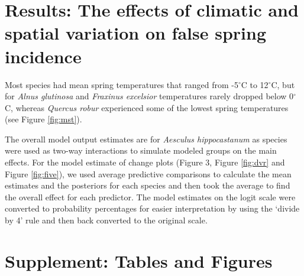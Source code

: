 \documentclass{article}\usepackage[]{graphicx}\usepackage[]{color}
\begin{document}
\section*{Results: The effects of climatic and spatial variation on false spring incidence}
Most species had mean spring temperatures that ranged from -5$^{\circ}$C to 12$^{\circ}$C, but for \textit{Alnus glutinosa} and \textit{Fraxinus excelsior} temperatures rarely dropped below 0$^{\circ}$C, whereas \textit{Quercus robur} experienced some of the lowest spring temperatures (see Figure \ref{fig:mst}). 

The overall model output estimates are for \textit{Aesculus hippocastanum} as species were used as two-way interactions to simulate modeled groups on the main effects. For the model estimate of change plots (Figure 3, Figure \ref{fig:dvr} and Figure \ref{fig:five}), we used average predictive comparisons to calculate the mean estimates and the posteriors for each species and then took the average to find the overall effect for each predictor. The model estimates on the logit scale were converted to probability percentages for easier interpretation by using the `divide by 4' rule \citep{Gelman2006} and then back converted to the original scale. %

\newpage
\nocite{NPN2019}


\newpage
\section*{Supplement: Tables and Figures}
  
\end{document}

